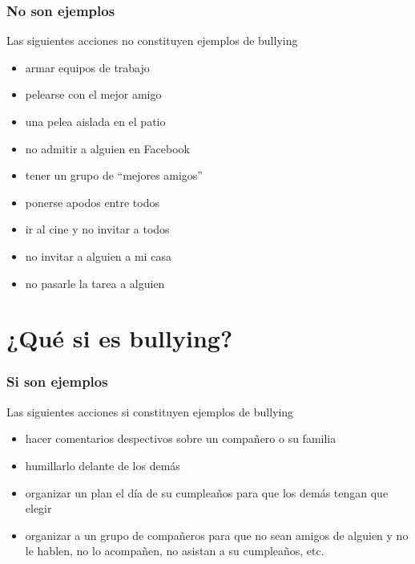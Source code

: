 \documentclass[12pt,spanish,x11names,svgnames]{beamer}
\begin{document}
\begin{frame}
  \frametitle{No son ejemplos}
  \begin{alertblock}{Las siguientes acciones no constituyen ejemplos de bullying}
    \begin{itemize}
      \pause
    \item<+-> armar equipos de trabajo
    \item<+-> pelearse con el mejor amigo
    \item<+-> una pelea aislada en el patio
    \item<+-> no admitir a alguien en Facebook
    \item<+-> tener un grupo de ``mejores amigos''
    \item<+-> ponerse apodos entre todos
    \item<+-> ir al cine y no invitar a todos
    \item<+-> no invitar a alguien a mi casa
    \item<+-> no pasarle la tarea a alguien   
    \end{itemize}
  \end{alertblock}
\end{frame}
\section{¿Qué si es bullying?}
\begin{frame}
  \frametitle{Si son ejemplos}
  \begin{exampleblock}{Las siguientes acciones si constituyen ejemplos de
      bullying}
    \pause
    \begin{itemize}
    \item<+-> hacer comentarios despectivos sobre un compañero o su familia
    \item<+-> humillarlo delante de los demás
    \item<+-> organizar un plan el día de su cumpleaños para que los demás
        tengan que elegir
    \item<+-> organizar a un grupo de compañeros para que no sean amigos de alguien y no le hablen, no lo acompañen, no asistan a su cumpleaños, etc.   
    \end{itemize}
  \end{exampleblock}
\end{frame}
\end{document}
